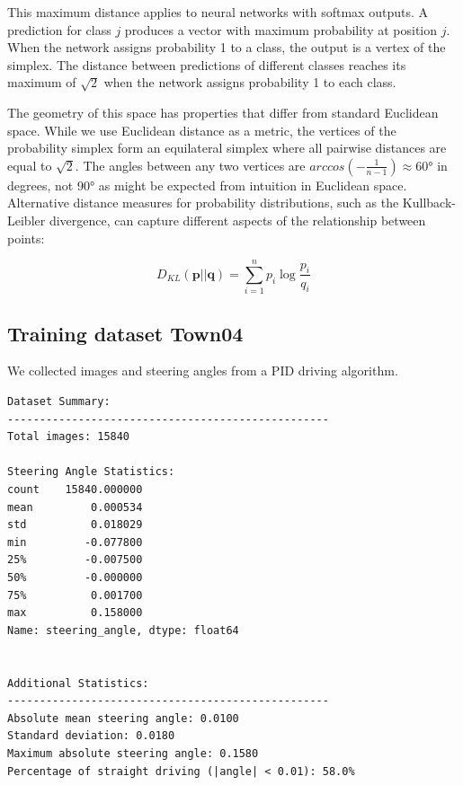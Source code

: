 This maximum distance applies to neural networks with softmax outputs. A prediction for class $j$ produces a vector with maximum probability at position $j$. When the network assigns probability 1 to a class, the output is a vertex of the simplex. The distance between predictions of different classes reaches its maximum of $\sqrt{2}$ when the network assigns probability 1 to each class.

The geometry of this space has properties that differ from standard Euclidean space. While we use Euclidean distance as a metric, the vertices of the probability simplex form an equilateral simplex where all pairwise distances are equal to $\sqrt{2}$. The angles between any two vertices are $arccos(-\frac{1}{n-1}) \approx 60°$ in degrees, not 90° as might be expected from intuition in Euclidean space. Alternative distance measures for probability distributions, such as the Kullback-Leibler divergence, can capture different aspects of the relationship between points:

\begin{equation}
D_{KL}(\mathbf{p}||\mathbf{q}) = \sum_{i=1}^n p_i \log\frac{p_i}{q_i}
\end{equation}


\subsection{Training dataset Town04}

We collected images and steering angles from a PID driving algorithm.

\begin{verbatim}
Dataset Summary:
--------------------------------------------------
Total images: 15840

Steering Angle Statistics:
count    15840.000000
mean         0.000534
std          0.018029
min         -0.077800
25%         -0.007500
50%         -0.000000
75%          0.001700
max          0.158000
Name: steering_angle, dtype: float64


Additional Statistics:
--------------------------------------------------
Absolute mean steering angle: 0.0100
Standard deviation: 0.0180
Maximum absolute steering angle: 0.1580
Percentage of straight driving (|angle| < 0.01): 58.0%    
\end{verbatim}

